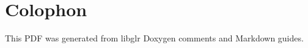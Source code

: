 \clearpage
\chapter*{Colophon}
This PDF was generated from libglr Doxygen comments and Markdown guides.

